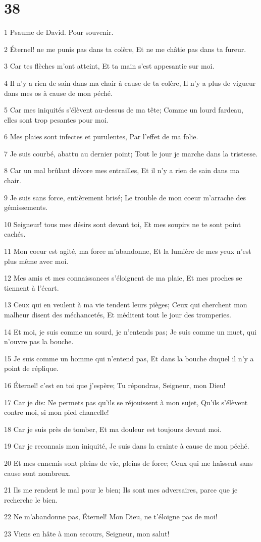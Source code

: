 \chapter{38}

\par 1 Psaume de David. Pour souvenir.
\par 2 Éternel! ne me punis pas dans ta colère, Et ne me châtie pas dans ta fureur.
\par 3 Car tes flèches m'ont atteint, Et ta main s'est appesantie sur moi.
\par 4 Il n'y a rien de sain dans ma chair à cause de ta colère, Il n'y a plus de vigueur dans mes os à cause de mon péché.
\par 5 Car mes iniquités s'élèvent au-dessus de ma tête; Comme un lourd fardeau, elles sont trop pesantes pour moi.
\par 6 Mes plaies sont infectes et purulentes, Par l'effet de ma folie.
\par 7 Je suis courbé, abattu au dernier point; Tout le jour je marche dans la tristesse.
\par 8 Car un mal brûlant dévore mes entrailles, Et il n'y a rien de sain dans ma chair.
\par 9 Je suis sans force, entièrement brisé; Le trouble de mon coeur m'arrache des gémissements.
\par 10 Seigneur! tous mes désirs sont devant toi, Et mes soupirs ne te sont point cachés.
\par 11 Mon coeur est agité, ma force m'abandonne, Et la lumière de mes yeux n'est plus même avec moi.
\par 12 Mes amis et mes connaissances s'éloignent de ma plaie, Et mes proches se tiennent à l'écart.
\par 13 Ceux qui en veulent à ma vie tendent leurs pièges; Ceux qui cherchent mon malheur disent des méchancetés, Et méditent tout le jour des tromperies.
\par 14 Et moi, je suis comme un sourd, je n'entends pas; Je suis comme un muet, qui n'ouvre pas la bouche.
\par 15 Je suis comme un homme qui n'entend pas, Et dans la bouche duquel il n'y a point de réplique.
\par 16 Éternel! c'est en toi que j'espère; Tu répondras, Seigneur, mon Dieu!
\par 17 Car je dis: Ne permets pas qu'ils se réjouissent à mon sujet, Qu'ils s'élèvent contre moi, si mon pied chancelle!
\par 18 Car je suis près de tomber, Et ma douleur est toujours devant moi.
\par 19 Car je reconnais mon iniquité, Je suis dans la crainte à cause de mon péché.
\par 20 Et mes ennemis sont pleins de vie, pleins de force; Ceux qui me haïssent sans cause sont nombreux.
\par 21 Ils me rendent le mal pour le bien; Ils sont mes adversaires, parce que je recherche le bien.
\par 22 Ne m'abandonne pas, Éternel! Mon Dieu, ne t'éloigne pas de moi!
\par 23 Viens en hâte à mon secours, Seigneur, mon salut!

